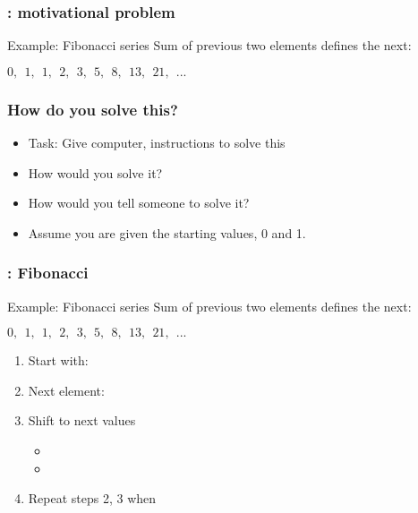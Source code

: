 \documentclass[14pt,compress]{beamer}
\begin{document}
\begin{frame}
  \frametitle{: motivational problem}
\begin{block}{Example: Fibonacci series}
  Sum of previous two elements defines the next:
  \begin{center}
    $0,\ \ 1,\ \ 1,\ \ 2,\ \ 3,\ \ 5,\ \ 8,\ \ 13,\ \ 21,\ \ ...$
  \end{center}
\end{block}
\end{frame}

\begin{frame}
  \frametitle{How do you solve this?}
  \begin{itemize}
  \item Task: Give computer, instructions to solve this
    \vspace*{2em}
  \item How would you solve it?
  \item How would you tell someone to solve it?
    \vspace*{1em}
  \item Assume you are given the starting values, 0 and 1.
  \end{itemize}

\end{frame}

\begin{frame}[fragile]
  \frametitle{: Fibonacci}
\begin{block}{Example: Fibonacci series}
  Sum of previous two elements defines the next:
  \begin{center}
    $0,\ \ 1,\ \ 1,\ \ 2,\ \ 3,\ \ 5,\ \ 8,\ \ 13,\ \ 21,\ \ ...$
  \end{center}
\end{block}
\pause
\begin{enumerate}
\item Start with: 
  \pause
\item Next element: 
  \pause
\item Shift  to next values
  \begin{itemize}
  \item {}
  \item {}
  \end{itemize}
  \pause
\item Repeat steps 2, 3 when 
\end{enumerate}
\end{frame}
\end{document}
